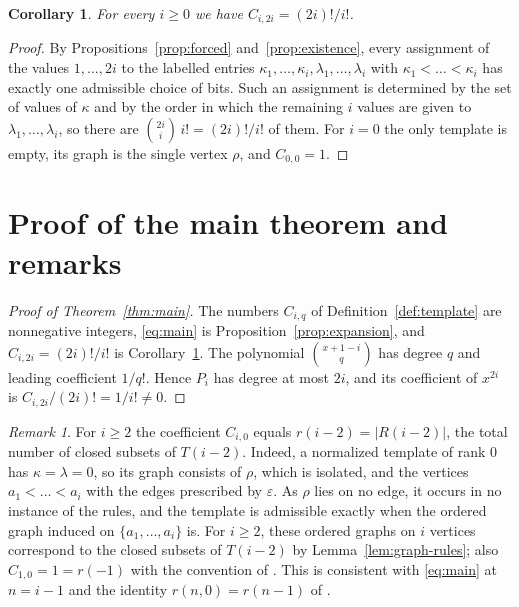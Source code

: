 \documentclass[11pt]{amsart}
\newtheorem{corollary}[theorem]{Corollary}
\theoremstyle{definition}
\theoremstyle{remark}
\newtheorem{remark}[theorem]{Remark}
\numberwithin{equation}{section}
\begin{document}
\begin{corollary}\label{cor:top}
For every $i\ge0$ we have $C_{i,2i}=(2i)!/i!$.
\end{corollary}

\begin{proof}
By Propositions~\ref{prop:forced} and~\ref{prop:existence}, every assignment of the values $1,\dots,2i$ to the labelled entries $\kappa_1,\dots,\kappa_i,\lambda_1,\dots,\lambda_i$ with $\kappa_1<\dots<\kappa_i$ has exactly one admissible choice of bits. Such an assignment is determined by the set of values of $\kappa$ and by the order in which the remaining $i$ values are given to $\lambda_1,\dots,\lambda_i$, so there are $\binom{2i}{i}\,i!=(2i)!/i!$ of them. For $i=0$ the only template is empty, its graph is the single vertex $\rho$, and $C_{0,0}=1$.
\end{proof}

\section{Proof of the main theorem and remarks}\label{sec:proof}

\begin{proof}[Proof of Theorem~\ref{thm:main}]
The numbers $C_{i,q}$ of Definition~\ref{def:template} are nonnegative integers, \eqref{eq:main} is Proposition~\ref{prop:expansion}, and $C_{i,2i}=(2i)!/i!$ is Corollary~\ref{cor:top}. The polynomial $\binom{x+1-i}{q}$ has degree $q$ and leading coefficient $1/q!$. Hence $P_i$ has degree at most $2i$, and its coefficient of $x^{2i}$ is $C_{i,2i}/(2i)!=1/i!\neq0$.
\end{proof}

\begin{remark}\label{rem:rank-zero}
For $i\ge2$ the coefficient $C_{i,0}$ equals $r(i-2)=|R(i-2)|$, the total number of closed subsets of $T(i-2)$. Indeed, a normalized template of rank $0$ has $\kappa=\lambda=0$, so its graph consists of $\rho$, which is isolated, and the vertices $a_1<\dots<a_i$ with the edges prescribed by $\varepsilon$. As $\rho$ lies on no edge, it occurs in no instance of the rules, and the template is admissible exactly when the ordered graph induced on $\{a_1,\dots,a_i\}$ is. For $i\ge2$, these ordered graphs on $i$ vertices correspond to the closed subsets of $T(i-2)$ by Lemma~\ref{lem:graph-rules}; also $C_{1,0}=1=r(-1)$ with the convention of \cite{MX}. This is consistent with \eqref{eq:main} at $n=i-1$ and the identity $r(n,0)=r(n-1)$ of \cite[Proposition~10]{MX}.
\end{remark}
\end{document}
